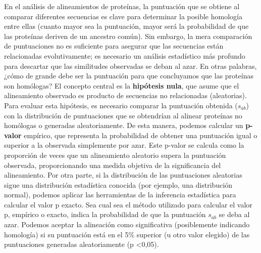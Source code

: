 En el análisis de alineamientos de proteínas, la puntuación que se obtiene al comparar diferentes secuencias es clave para determinar la posible homología entre ellas (cuanto mayor sea la puntuación, mayor será la probabilidad de que las proteínas deriven de un ancestro común). Sin embargo, la mera comparación de puntuaciones no es suficiente para asegurar que las secuencias están relacionadas evolutivamente; es necesario un análisis estadístico más profundo para descartar que las similitudes observadas se deban al azar. En otras palabras, ¿cómo de grande debe ser la puntuación para que concluyamos que las proteínas son homólogas?
El concepto central es la \textbf{hipótesis nula}, que asume que el alineamiento observado es producto de secuencias no relacionadas (aleatorias). Para evaluar esta hipótesis, es necesario comparar la puntuación obtenida ($s_{ab}$) con la distribución de puntuaciones que se obtendrían al alinear proteínas no homólogas o generadas aleatoriamente. De esta manera, podemos calcular un \textbf{p-valor} empírico, que representa la probabilidad de obtener una puntuación igual o superior a la observada simplemente por azar. Este p-valor se calcula como la proporción de veces que un alineamiento aleatorio supera la puntuación observada, proporcionando una medida objetiva de la significancia del alineamiento.
Por otra parte, si la distribución de las puntuaciones aleatorias sigue una distribución estadística conocida (por ejemplo, una distribución normal), podemos aplicar las herramientas de la inferencia estadística para calcular el valor p exacto. Sea cual sea el método utilizado para calcular el valor p, empírico o exacto, indica la probabilidad de que la puntuación $s_{ab}$ se deba al azar. Podemos aceptar la alineación como significativa (posiblemente indicando homología) si su puntuación está en el 5\% superior (u otro valor elegido) de las puntuaciones generadas aleatoriamente (p <0,05).


